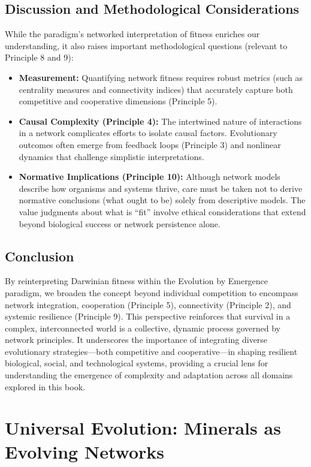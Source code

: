 \documentclass[12pt,openany]{book}
\let\cleardoublepage\clearpage %
\begin{document}
\section{Discussion and Methodological Considerations}
While the paradigm's networked interpretation of fitness enriches our understanding, it also raises important methodological questions (relevant to Principle 8 and 9):
\begin{itemize}
    \item \textbf{Measurement:} Quantifying network fitness requires robust metrics (such as centrality measures and connectivity indices) that accurately capture both competitive and cooperative dimensions (Principle 5).
    \item \textbf{Causal Complexity (Principle 4):} The intertwined nature of interactions in a network complicates efforts to isolate causal factors. Evolutionary outcomes often emerge from feedback loops (Principle 3) and nonlinear dynamics that challenge simplistic interpretations.
    \item \textbf{Normative Implications (Principle 10):} Although network models describe how organisms and systems thrive, care must be taken not to derive normative conclusions (what ought to be) solely from descriptive models. The value judgments about what is “fit” involve ethical considerations that extend beyond biological success or network persistence alone.
\end{itemize} %

\section{Conclusion}
By reinterpreting Darwinian fitness within the Evolution by Emergence paradigm, we broaden the concept beyond individual competition to encompass network integration, cooperation (Principle 5), connectivity (Principle 2), and systemic resilience (Principle 9). This perspective reinforces that survival in a complex, interconnected world is a collective, dynamic process governed by network principles. It underscores the importance of integrating diverse evolutionary strategies—both competitive and cooperative—in shaping resilient biological, social, and technological systems, providing a crucial lens for understanding the emergence of complexity and adaptation across all domains explored in this book. %
\cleardoublepage

\chapter{Universal Evolution: Minerals as Evolving Networks} %
\label{ch:UniversalEvolution}
\end{document}
